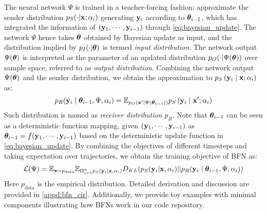 The neural network $\Psi$ is trained in a teacher-forcing fashion: approximate the sender distribution $p_S(\cdot| \bold{x};\alpha_i)$ generating $\bold{y}_i$ according to $\bm{\theta}_{i-1}$, which has integrated the information of $(\bold{y}_1, \cdots, \bold{y}_{i-1})$ through \cref{eq:bayesian_update}. The network $\Psi$ hence takes  ${\bm{\theta}}$ obtained by Bayesian update as input, and the distribution implied by $p_I(\cdot|{\bm{\theta}})$ is termed \emph{input distribution}. The network output $\Psi({\bm{\theta}})$ is interpreted as the parameter of an updated distribution $p_O(\cdot|\Psi({\bm{\theta}}))$ over sample space, referred to as \emph{output distribution}. Combining the network output $\Psi({\bm{\theta}})$ and the sender distribution, we obtain the approximation to $p_S\left(\bold{y}_i \mid \bold{x} ; \alpha_i\right)$ as:
\begin{equation}
\label{eq:abs_rece}
    p_R(\bold{y}_i\mid {\bm{\theta}}_{i-1},\Psi,\alpha_i)= \mathbb{E}_{p_O(\bold{x}' |\Psi(\boldsymbol{{\bm{\theta}}}_{i-1}))}p_S\left(\bold{y}_i \mid \bold{x}' ; \alpha_i\right)
\end{equation}
Such distribution is named as \emph{receiver distribution} $p_R$. Note that ${\bm{\theta}}_{i-1}$ can be seen as a deterministic function mapping, given $(\bold{y}_1,\cdots,\bold{y}_{i-1})$  as ${\bm{\theta}}_{i-1} = f(\bold{y}_1,\cdots,\bold{y}_{i-1})$ based on the deterministic update function in \cref{eq:bayesian_update}. By combining the objectives of different timesteps and taking expectation over trajectories, we obtain the training objective of BFN as:
\begin{align}\label{eq:loss_n}
    \mathcal{L}(\Psi) = \mathbb{E}_{\operatorname{\mathbf{x}} \sim p_{\text{data}}}\mathbb{E}_{\Pi_{i=1}^n p_S(\bold{y}_i|\bold{x},\alpha_i)}  D_{K L} (p_S(\bold{y}_i|\bold{x},\alpha_i)||p_R(\bold{y}_i\mid {\bm{\theta}}_{i-1},\Psi,\alpha_i))
\end{align}
Here $p_{\text{data}}$ is the empirical distribution. Detailed derivation and discussion are provided in \cref{appd:bfn_cir}. Additionally, we provide toy examples with minimal components illustrating how BFNs work in our code repository.





